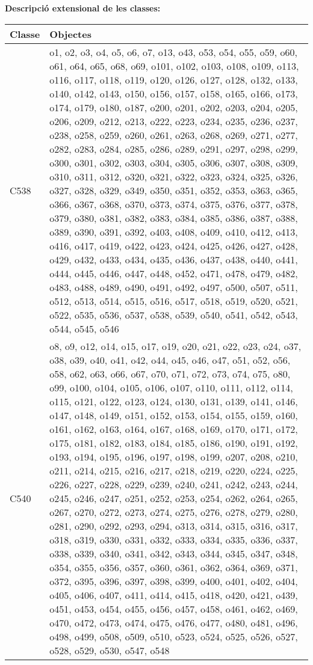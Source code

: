 {\noindent \bf Descripci\'o extensional de les classes: }
\begin{center}
\begin{tabular}{|p{}|p{}|}
\hline
\bf Classe & \bf Objectes \\
\hline
C538 & o1, o2, o3, o4, o5, o6, o7, o13, o43, o53, o54, o55, o59, o60, o61, o64, o65, o68, o69, o101, o102, o103, o108, o109, o113, o116, o117, o118, o119, o120, o126, o127, o128, o132, o133, o140, o142, o143, o150, o156, o157, o158, o165, o166, o173, o174, o179, o180, o187, o200, o201, o202, o203, o204, o205, o206, o209, o212, o213, o222, o223, o234, o235, o236, o237, o238, o258, o259, o260, o261, o263, o268, o269, o271, o277, o282, o283, o284, o285, o286, o289, o291, o297, o298, o299, o300, o301, o302, o303, o304, o305, o306, o307, o308, o309, o310, o311, o312, o320, o321, o322, o323, o324, o325, o326, o327, o328, o329, o349, o350, o351, o352, o353, o363, o365, o366, o367, o368, o370, o373, o374, o375, o376, o377, o378, o379, o380, o381, o382, o383, o384, o385, o386, o387, o388, o389, o390, o391, o392, o403, o408, o409, o410, o412, o413, o416, o417, o419, o422, o423, o424, o425, o426, o427, o428, o429, o432, o433, o434, o435, o436, o437, o438, o440, o441, o444, o445, o446, o447, o448, o452, o471, o478, o479, o482, o483, o488, o489, o490, o491, o492, o497, o500, o507, o511, o512, o513, o514, o515, o516, o517, o518, o519, o520, o521, o522, o535, o536, o537, o538, o539, o540, o541, o542, o543, o544, o545, o546 \\
\hline
C540 & o8, o9, o12, o14, o15, o17, o19, o20, o21, o22, o23, o24, o37, o38, o39, o40, o41, o42, o44, o45, o46, o47, o51, o52, o56, o58, o62, o63, o66, o67, o70, o71, o72, o73, o74, o75, o80, o99, o100, o104, o105, o106, o107, o110, o111, o112, o114, o115, o121, o122, o123, o124, o130, o131, o139, o141, o146, o147, o148, o149, o151, o152, o153, o154, o155, o159, o160, o161, o162, o163, o164, o167, o168, o169, o170, o171, o172, o175, o181, o182, o183, o184, o185, o186, o190, o191, o192, o193, o194, o195, o196, o197, o198, o199, o207, o208, o210, o211, o214, o215, o216, o217, o218, o219, o220, o224, o225, o226, o227, o228, o229, o239, o240, o241, o242, o243, o244, o245, o246, o247, o251, o252, o253, o254, o262, o264, o265, o267, o270, o272, o273, o274, o275, o276, o278, o279, o280, o281, o290, o292, o293, o294, o313, o314, o315, o316, o317, o318, o319, o330, o331, o332, o333, o334, o335, o336, o337, o338, o339, o340, o341, o342, o343, o344, o345, o347, o348, o354, o355, o356, o357, o360, o361, o362, o364, o369, o371, o372, o395, o396, o397, o398, o399, o400, o401, o402, o404, o405, o406, o407, o411, o414, o415, o418, o420, o421, o439, o451, o453, o454, o455, o456, o457, o458, o461, o462, o469, o470, o472, o473, o474, o475, o476, o477, o480, o481, o496, o498, o499, o508, o509, o510, o523, o524, o525, o526, o527, o528, o529, o530, o547, o548 \\

\end{tabular}
\end{center}
